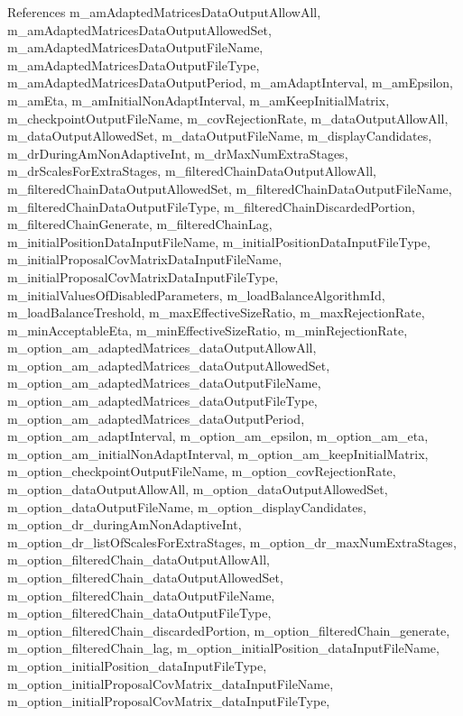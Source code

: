 References m\-\_\-am\-Adapted\-Matrices\-Data\-Output\-Allow\-All, m\-\_\-am\-Adapted\-Matrices\-Data\-Output\-Allowed\-Set, m\-\_\-am\-Adapted\-Matrices\-Data\-Output\-File\-Name, m\-\_\-am\-Adapted\-Matrices\-Data\-Output\-File\-Type, m\-\_\-am\-Adapted\-Matrices\-Data\-Output\-Period, m\-\_\-am\-Adapt\-Interval, m\-\_\-am\-Epsilon, m\-\_\-am\-Eta, m\-\_\-am\-Initial\-Non\-Adapt\-Interval, m\-\_\-am\-Keep\-Initial\-Matrix, m\-\_\-checkpoint\-Output\-File\-Name, m\-\_\-cov\-Rejection\-Rate, m\-\_\-data\-Output\-Allow\-All, m\-\_\-data\-Output\-Allowed\-Set, m\-\_\-data\-Output\-File\-Name, m\-\_\-display\-Candidates, m\-\_\-dr\-During\-Am\-Non\-Adaptive\-Int, m\-\_\-dr\-Max\-Num\-Extra\-Stages, m\-\_\-dr\-Scales\-For\-Extra\-Stages, m\-\_\-filtered\-Chain\-Data\-Output\-Allow\-All, m\-\_\-filtered\-Chain\-Data\-Output\-Allowed\-Set, m\-\_\-filtered\-Chain\-Data\-Output\-File\-Name, m\-\_\-filtered\-Chain\-Data\-Output\-File\-Type, m\-\_\-filtered\-Chain\-Discarded\-Portion, m\-\_\-filtered\-Chain\-Generate, m\-\_\-filtered\-Chain\-Lag, m\-\_\-initial\-Position\-Data\-Input\-File\-Name, m\-\_\-initial\-Position\-Data\-Input\-File\-Type, m\-\_\-initial\-Proposal\-Cov\-Matrix\-Data\-Input\-File\-Name, m\-\_\-initial\-Proposal\-Cov\-Matrix\-Data\-Input\-File\-Type, m\-\_\-initial\-Values\-Of\-Disabled\-Parameters, m\-\_\-load\-Balance\-Algorithm\-Id, m\-\_\-load\-Balance\-Treshold, m\-\_\-max\-Effective\-Size\-Ratio, m\-\_\-max\-Rejection\-Rate, m\-\_\-min\-Acceptable\-Eta, m\-\_\-min\-Effective\-Size\-Ratio, m\-\_\-min\-Rejection\-Rate, m\-\_\-option\-\_\-am\-\_\-adapted\-Matrices\-\_\-data\-Output\-Allow\-All, m\-\_\-option\-\_\-am\-\_\-adapted\-Matrices\-\_\-data\-Output\-Allowed\-Set, m\-\_\-option\-\_\-am\-\_\-adapted\-Matrices\-\_\-data\-Output\-File\-Name, m\-\_\-option\-\_\-am\-\_\-adapted\-Matrices\-\_\-data\-Output\-File\-Type, m\-\_\-option\-\_\-am\-\_\-adapted\-Matrices\-\_\-data\-Output\-Period, m\-\_\-option\-\_\-am\-\_\-adapt\-Interval, m\-\_\-option\-\_\-am\-\_\-epsilon, m\-\_\-option\-\_\-am\-\_\-eta, m\-\_\-option\-\_\-am\-\_\-initial\-Non\-Adapt\-Interval, m\-\_\-option\-\_\-am\-\_\-keep\-Initial\-Matrix, m\-\_\-option\-\_\-checkpoint\-Output\-File\-Name, m\-\_\-option\-\_\-cov\-Rejection\-Rate, m\-\_\-option\-\_\-data\-Output\-Allow\-All, m\-\_\-option\-\_\-data\-Output\-Allowed\-Set, m\-\_\-option\-\_\-data\-Output\-File\-Name, m\-\_\-option\-\_\-display\-Candidates, m\-\_\-option\-\_\-dr\-\_\-during\-Am\-Non\-Adaptive\-Int, m\-\_\-option\-\_\-dr\-\_\-list\-Of\-Scales\-For\-Extra\-Stages, m\-\_\-option\-\_\-dr\-\_\-max\-Num\-Extra\-Stages, m\-\_\-option\-\_\-filtered\-Chain\-\_\-data\-Output\-Allow\-All, m\-\_\-option\-\_\-filtered\-Chain\-\_\-data\-Output\-Allowed\-Set, m\-\_\-option\-\_\-filtered\-Chain\-\_\-data\-Output\-File\-Name, m\-\_\-option\-\_\-filtered\-Chain\-\_\-data\-Output\-File\-Type, m\-\_\-option\-\_\-filtered\-Chain\-\_\-discarded\-Portion, m\-\_\-option\-\_\-filtered\-Chain\-\_\-generate, m\-\_\-option\-\_\-filtered\-Chain\-\_\-lag, m\-\_\-option\-\_\-initial\-Position\-\_\-data\-Input\-File\-Name, m\-\_\-option\-\_\-initial\-Position\-\_\-data\-Input\-File\-Type, m\-\_\-option\-\_\-initial\-Proposal\-Cov\-Matrix\-\_\-data\-Input\-File\-Name, m\-\_\-option\-\_\-initial\-Proposal\-Cov\-Matrix\-\_\-data\-Input\-File\-Type, 